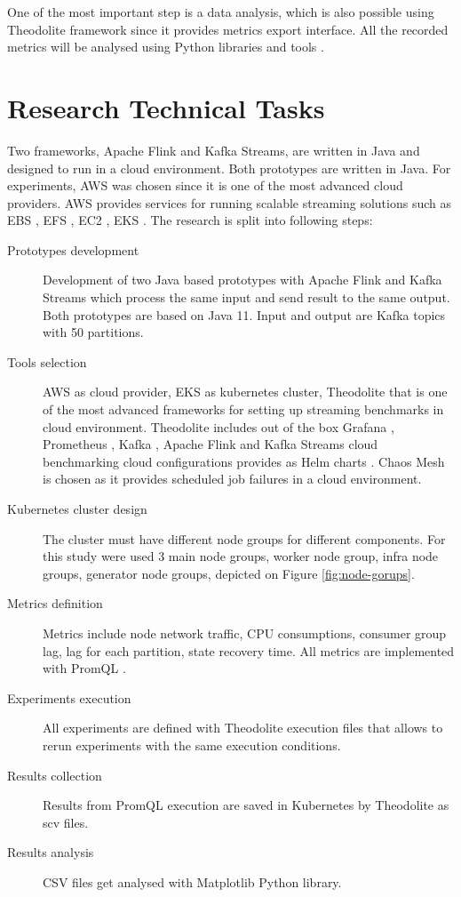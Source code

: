 One of the most important step is a data analysis, which is also possible using Theodolite framework
since it provides metrics export interface.
All the recorded metrics will be analysed using Python libraries and tools
\cite{hightower2019kubernetes} \cite{pivotto2023prometheus} \cite{theodolite_framework}.


\section{Research Technical Tasks}\label{sec:research-objectives}
Two frameworks, Apache Flink and Kafka Streams, are written in Java and designed to run in a cloud environment.
Both prototypes are written in Java.
For experiments,  AWS was chosen since it is one of the most advanced cloud providers.
AWS provides services for running scalable streaming solutions such as EBS \cite{awsEBS}, EFS \cite{awsEFS}, EC2 \cite{EC2}, EKS \cite{AWSEKS2024}.
The research is split into following steps:

\begin{description}
    \item[Prototypes development] Development of two Java based prototypes with Apache Flink and
    Kafka Streams which process the same input and send result to the same output.
    Both prototypes are based on Java 11.
    Input and output are Kafka topics with 50 partitions.
    \item[Tools selection] AWS as cloud provider, EKS as kubernetes cluster, Theodolite \cite{theodolite_framework}
    \cite{applications_benhcmarks} that is one of the most advanced frameworks for setting up streaming benchmarks
    in cloud environment.
    Theodolite includes out of the box Grafana \cite{Grafana2024}, Prometheus \cite{Prometheus2024} \cite{PrometheusOperator2024}, Kafka \cite{kafka_intro}, Apache Flink and Kafka Streams cloud
    benchmarking cloud configurations provides as Helm charts \cite{helm}.
    Chaos Mesh \cite{chaosMesh} is chosen as it provides scheduled job failures in a cloud environment.
    \item [Kubernetes cluster design] The cluster must have different node groups for different components.
    For this study were used 3 main node groups, worker node group, infra node groups, generator node groups, depicted on Figure \ref{fig:node-gorups}.
    \item[Metrics definition] Metrics include node network traffic, CPU consumptions, consumer group lag,
    lag for each partition, state recovery time.
    All metrics are implemented with PromQL \cite{prometheusQuerying}.
    \item [Experiments execution] All experiments are defined with Theodolite execution files \cite{theodoliteExecution}
    that allows to rerun experiments with the same execution conditions.
    \item[Results collection] Results from PromQL execution are saved in Kubernetes by Theodolite as scv files.
    \item[Results analysis] CSV files get analysed with Matplotlib Python library.
\end{description}

